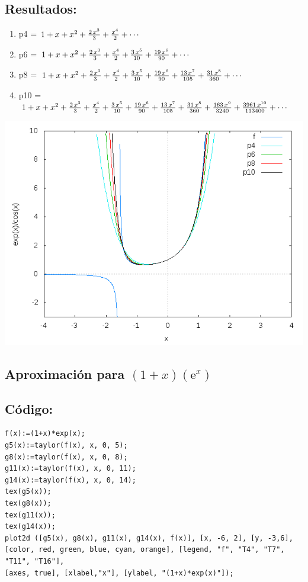 \documentclass[10pt]{article}
\begin{document}
\subsection*{Resultados:}
\begin{enumerate}
\item p4 = $1+x+x^2+{{2\,x^3}\over{3}}+{{x^4}\over{2}}+\cdots $
\item p6 = $1+x+x^2+{{2\,x^3}\over{3}}+{{x^4}\over{2}}+{{3\,x^5}\over{10}}+{{19
 \,x^6}\over{90}}+\cdots $
\item p8 = $1+x+x^2+{{2\,x^3}\over{3}}+{{x^4}\over{2}}+{{3\,x^5}\over{10}}+{{19
 \,x^6}\over{90}}+{{13\,x^7}\over{105}}+{{31\,x^8}\over{360}}+\cdots $
\item p10 = $1+x+x^2+{{2\,x^3}\over{3}}+{{x^4}\over{2}}+{{3\,x^5}\over{10}}+{{19
 \,x^6}\over{90}}+{{13\,x^7}\over{105}}+{{31\,x^8}\over{360}}+{{163\,
 x^9}\over{3240}}+{{3961\,x^{10}}\over{113400}}+\cdots $
\end{enumerate}
\includegraphics[scale=0.6]{plot4}

\newpage 
\subsection{Aproximación para $(1+x)(\mathrm{e}^{x})$}
\subsection*{Código:}
\begin{verbatim}
f(x):=(1+x)*exp(x);
g5(x):=taylor(f(x), x, 0, 5);
g8(x):=taylor(f(x), x, 0, 8);
g11(x):=taylor(f(x), x, 0, 11);
g14(x):=taylor(f(x), x, 0, 14);
tex(g5(x));
tex(g8(x));
tex(g11(x));
tex(g14(x));
plot2d ([g5(x), g8(x), g11(x), g14(x), f(x)], [x, -6, 2], [y, -3,6], 
[color, red, green, blue, cyan, orange], [legend, "f", "T4", "T7", "T11", "T16"], 
[axes, true], [xlabel,"x"], [ylabel, "(1+x)*exp(x)"]);
\end{verbatim}
\end{document}
